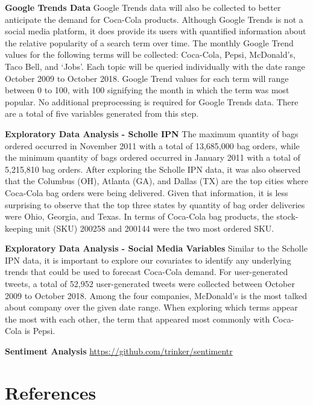 \documentclass[12pt,oneside]{chicagocapstone}
\begin{document}
\textbf{Google Trends Data}
Google Trends data will also be collected to better anticipate the demand for Coca-Cola products. Although Google Trends is not a social media platform, it does provide its users with quantified information about the relative popularity of a search term over time. The monthly Google Trend values for the following terms will be collected: Coca-Cola, Pepsi, McDonald's, Taco Bell, and `Jobs'. Each topic will be queried individually with the date range October 2009 to October 2018. Google Trend values for each term will range between 0 to 100, with 100 signifying the month in which the term was most popular. No additional preprocessing is required for Google Trends data. There are a total of five variables generated from this step.

\textbf{Exploratory Data Analysis - Scholle IPN}
The maximum quantity of bags ordered occurred in November 2011 with a total of 13,685,000 bag orders, while the minimum quantity of bags ordered occurred in January 2011 with a total of 5,215,810 bag orders. After exploring the Scholle IPN data, it was also observed that the Columbus (OH), Atlanta (GA), and Dallas (TX) are the top cities where Coca-Cola bag orders were being delivered. Given that information, it is less surprising to observe that the top three states by quantity of bag order deliveries were Ohio, Georgia, and Texas. In terms of Coca-Cola bag products, the stock-keeping unit (SKU) 200258 and 200144 were the two most ordered SKU.

\textbf{Exploratory Data Analysis - Social Media Variables}
Similar to the Scholle IPN data, it is important to explore our covariates to identify any underlying trends that could be used to forecast Coca-Cola demand. For user-generated tweets, a total of 52,952 user-generated tweets were collected between October 2009 to October 2018. Among the four companies, McDonald's is the most talked about company over the given date range. When exploring which terms appear the most with each other, the term that appeared most commonly with Coca-Cola is Pepsi.

\textbf{Sentiment Analysis}
\url{https://github.com/trinker/sentimentr}

\backmatter

\hypertarget{references}{%
\chapter*{References}\label{references}}
\end{document}
